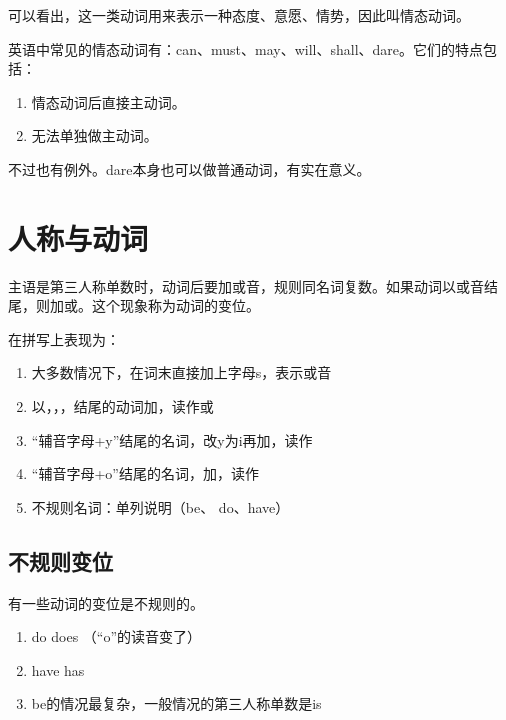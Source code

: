 \documentclass[10.5pt, a4paper]{ctexbook} %
\begin{document}
\begin{liju}
\end{liju}

可以看出，这一类动词用来表示一种态度、意愿、情势，因此叫情态动词。

英语中常见的情态动词有：can、must、may、will、shall、dare。它们的特点包括：
\begin{enumerate}
    \item 情态动词后直接主动词。
    \item 无法单独做主动词。
\end{enumerate}

不过也有例外。dare本身也可以做普通动词，有实在意义。

\section{人称与动词}

主语是第三人称单数时，动词后要加或音，规则同名词复数。如果动词以或音结尾，则加或。这个现象称为动词的变位。

在拼写上表现为：
\begin{enumerate}
    \item 大多数情况下，在词末直接加上字母s，表示或音
    \item 以，，，结尾的动词加，读作或
    \item “辅音字母+\;y”结尾的名词，改y为i再加，读作
    \item “辅音字母+\;o”结尾的名词，加，读作
    \item 不规则名词：单列说明（be、 do、have）
\end{enumerate}

\subsection{不规则变位}

有一些动词的变位是不规则的。

\begin{enumerate}
    \item  do \warr does （“o”的读音变了）
    \item  have \warr has
    \item  be的情况最复杂，一般情况的第三人称单数是is
\end{enumerate}
\end{document}
